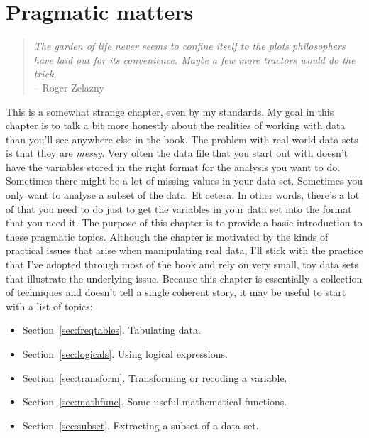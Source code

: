 



\chapter{Pragmatic matters~\label{ch:datahandling}}

\begin{quote}
{\it The garden of life never seems to confine itself to the plots philosophers have
laid out for its convenience. Maybe a few more tractors would do the trick.} \\
\hspace*{2cm} -- Roger Zelazny
\end{quote}


This is a somewhat strange chapter, even by my standards. My goal in this chapter is to talk a bit more honestly about the realities of working with data than you'll see anywhere else in the book. The problem with real world data sets is that they are {\it messy}. Very often the data file that you start out with doesn't have the variables stored in the right format for the analysis you want to do. Sometimes there might be a lot of missing values in your data set. Sometimes you only want to analyse a subset of the data. Et cetera. In other words, there's a lot of  that you need to do just to get the variables in your data set into the format that you need it. The purpose of this chapter is to provide a basic introduction to these pragmatic topics. Although the chapter is motivated by the kinds of practical issues that arise when manipulating real data, I'll stick with the practice that I've adopted through most of the book and rely on very small, toy data sets that illustrate the underlying issue. Because this chapter is essentially a collection of techniques and doesn't tell a single coherent story, it may be useful to start with a list of topics:

\begin{itemize} 
\item Section~\ref{sec:freqtables}. Tabulating data.
\item Section~\ref{sec:logicals}. Using logical expressions.
\item Section~\ref{sec:transform}. Transforming or recoding a variable.
\item Section~\ref{sec:mathfunc}. Some useful mathematical functions.
\item Section~\ref{sec:subset}. Extracting a subset of a data set.
\end{itemize}


